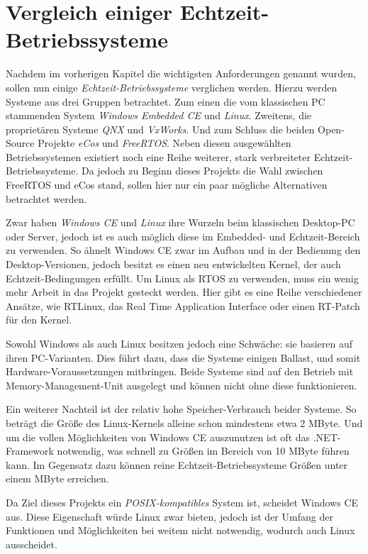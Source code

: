 \documentclass[
  a4paper,					%
  twoside,
  DIV=calc,     				%
  bibliography=totoc,
  cleardoublepage=empty,
  ngerman,     					%
  final       					%
]{scrbook}
\begin{document}
\section{Vergleich einiger Echtzeit-Betriebssysteme}
\label{sec:VergleichRTOS}
Nachdem im vorherigen Kapitel die wichtigsten Anforderungen genannt wurden, sollen nun einige \emph{Echtzeit-Betriebssysteme} verglichen werden. Hierzu werden Systeme aus drei Gruppen betrachtet. Zum einen die vom klassischen PC stammenden System \emph{Windows Embedded CE} und \emph{Linux}. Zweitens, die proprietären Systeme \emph{QNX} und \emph{VxWorks}. Und zum Schluss die beiden Open-Source Projekte \emph{eCos} und \emph{FreeRTOS}. Neben diesen ausgewählten Betriebssystemen existiert noch eine Reihe weiterer, stark verbreiteter Echtzeit-Betriebssysteme. Da jedoch zu Beginn dieses Projekts die Wahl zwischen FreeRTOS und eCos stand, sollen hier nur ein paar mögliche Alternativen betrachtet werden.

Zwar haben \emph{Windows CE} und \emph{Linux} ihre Wurzeln beim klassischen Desktop-PC oder Server, jedoch ist es auch möglich diese im Embedded- und Echtzeit-Bereich zu verwenden. So ähnelt Windows CE zwar im Aufbau und in der Bedienung den Desktop-Versionen, jedoch besitzt es einen neu entwickelten Kernel, der auch Echtzeit-Bedingungen erfüllt. Um Linux als RTOS zu verwenden, muss ein wenig mehr Arbeit in das Projekt gesteckt werden. Hier gibt es eine Reihe verschiedener Ansätze, wie RTLinux, das Real Time Application Interface oder einen RT-Patch für den Kernel. 

Sowohl Windows als auch Linux besitzen jedoch eine Schwäche: sie basieren auf ihren PC-Varianten. Dies führt dazu, dass die Systeme einigen Ballast, und somit Hardware-Voraussetzungen mitbringen. Beide Systeme sind auf den Betrieb mit Memory-Management-Unit ausgelegt und können nicht ohne diese funktionieren.

Ein weiterer Nachteil ist der relativ hohe Speicher-Verbrauch beider Systeme. So beträgt die Größe des Linux-Kernels alleine schon mindestens etwa 2 MByte. Und um die vollen Möglichkeiten von Windows CE auszunutzen ist oft das .NET-Framework notwendig, was schnell zu Größen im Bereich von 10 MByte führen kann. Im Gegensatz dazu können reine Echtzeit-Betriebssysteme Größen unter einem MByte erreichen. 

Da Ziel dieses Projekts ein \emph{POSIX-kompatibles} System ist, scheidet Windows CE aus. Diese Eigenschaft würde Linux zwar bieten, jedoch ist der Umfang der Funktionen und Möglichkeiten bei weitem nicht notwendig, wodurch auch Linux ausscheidet.
\end{document}
